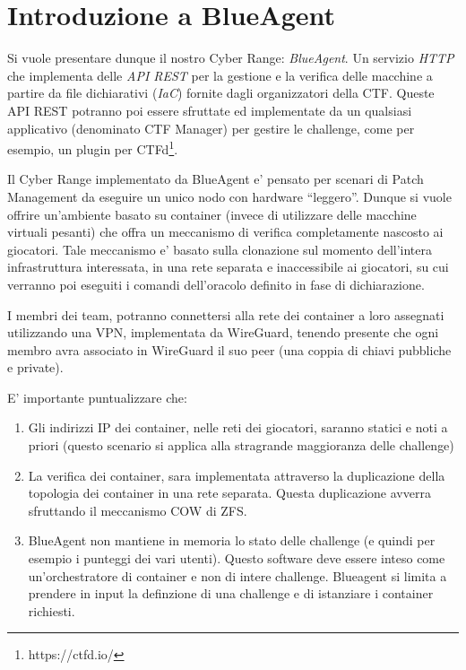 \section{Introduzione a BlueAgent}\label{introduzione-a-blueagent}

Si vuole presentare dunque il nostro Cyber Range: \emph{BlueAgent}. Un
servizio \emph{HTTP} che implementa delle \emph{API REST} per la
gestione e la verifica delle macchine a partire da file dichiarativi
(\emph{IaC}) fornite dagli organizzatori della CTF. Queste API REST
potranno poi essere sfruttate ed implementate da un qualsiasi
applicativo (denominato CTF Manager) per gestire le challenge, come per
esempio, un plugin per CTFd\footnote{\label{fn:ref_14}https://ctfd.io/}.

Il Cyber Range implementato da BlueAgent e' pensato per scenari di Patch
Management da eseguire un unico nodo con hardware ``leggero''. Dunque si
vuole offrire un'ambiente basato su container (invece di utilizzare
delle macchine virtuali pesanti) che offra un meccanismo di verifica
completamente nascosto ai giocatori. Tale meccanismo e' basato sulla
clonazione sul momento dell'intera infrastruttura interessata, in una
rete separata e inaccessibile ai giocatori, su cui verranno poi eseguiti
i comandi dell'oracolo definito in fase di dichiarazione.

I membri dei team, potranno connettersi alla rete dei container a loro
assegnati utilizzando una VPN, implementata da WireGuard, tenendo
presente che ogni membro avra associato in WireGuard il suo peer (una
coppia di chiavi pubbliche e private).

E' importante puntualizzare che:

\begin{enumerate}
\def\labelenumi{\arabic{enumi}.}
\tightlist
\item
  Gli indirizzi IP dei container, nelle reti dei giocatori, saranno
  statici e noti a priori (questo scenario si applica alla stragrande
  maggioranza delle challenge)
\item
  La verifica dei container, sara implementata attraverso la
  duplicazione della topologia dei container in una rete separata.
  Questa duplicazione avverra sfruttando il meccanismo COW di ZFS.
\item
  BlueAgent non mantiene in memoria lo stato delle challenge (e quindi
  per esempio i punteggi dei vari utenti). Questo software deve essere
  inteso come un'orchestratore di container e non di intere challenge.
  Blueagent si limita a prendere in input la definzione di una challenge
  e di istanziare i container richiesti.
\end{enumerate}

